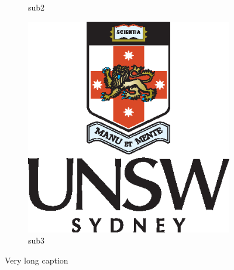\begin{figure}[!ht]
\begin{subfigure}[!ht]{0.3\linewidth}
    \caption{sub2} 
    \label{f:sub2}
\end{subfigure}
\begin{subfigure}[!ht]{0.3\linewidth}
  \centering
    \includegraphics[width=\textwidth]{unswlogo.eps}
    \caption{sub3} 
    \label{f:sub3}
\end{subfigure}
    \caption[Short caption]{Very long caption} 
    \label{f:fig2}
\end{figure}